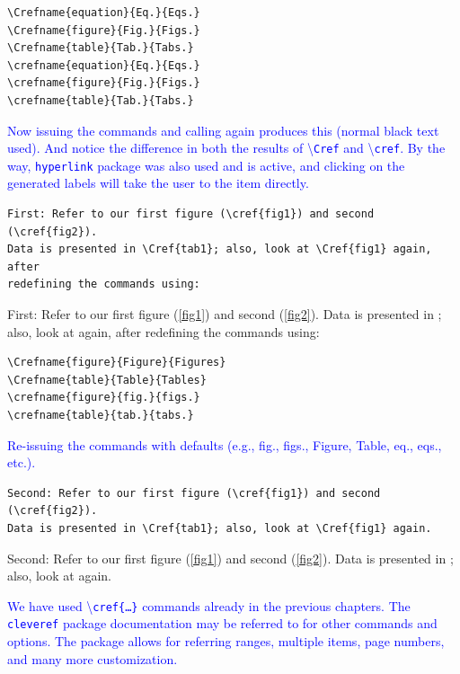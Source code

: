 \documentclass[phd]{ndsu-thesis-2022}
\newcommand\italk[1]{\textcolor{blue}{#1}}  %
\newcommand\cmd[1]{\textbackslash\texttt{#1}}  %
\newcommand\vb[1]{\textcolor{blue}{\texttt{#1}}}%
\begin{document}
\begin{verbatim}
\Crefname{equation}{Eq.}{Eqs.}
\Crefname{figure}{Fig.}{Figs.}
\Crefname{table}{Tab.}{Tabs.}
\crefname{equation}{Eq.}{Eqs.}
\crefname{figure}{Fig.}{Figs.}
\crefname{table}{Tab.}{Tabs.}
\end{verbatim}

\italk{Now issuing the commands and calling again produces this (normal black text used). And notice the difference in both the results of \cmd{Cref} and \cmd{cref}. By the way, \texttt{hyperlink} package was also used and is active, and clicking on the generated labels will take the user to the item directly. }


{\singlespacing
\begin{verbatim}
First: Refer to our first figure (\cref{fig1}) and second (\cref{fig2}). 
Data is presented in \Cref{tab1}; also, look at \Cref{fig1} again, after 
redefining the commands using:
\end{verbatim}
}
First: Refer to our first figure (\cref{fig1}) and second (\cref{fig2}). Data is presented in ; also, look at  again, after redefining the commands using:

\begin{verbatim}
\Crefname{figure}{Figure}{Figures}
\Crefname{table}{Table}{Tables}
\crefname{figure}{fig.}{figs.}
\crefname{table}{tab.}{tabs.}
\end{verbatim}


\italk{Re-issuing the commands with defaults (e.g., fig., figs., Figure, Table, eq., eqs., etc.).}


{\singlespacing
\begin{verbatim}
Second: Refer to our first figure (\cref{fig1}) and second (\cref{fig2}). 
Data is presented in \Cref{tab1}; also, look at \Cref{fig1} again. 
\end{verbatim}
}
Second: Refer to our first figure (\cref{fig1}) and second (\cref{fig2}). Data is presented in ; also, look at  again. 

\italk{We have used \cmd{cref\{\ldots\}} commands already in the previous chapters. The \vb{cleveref} package documentation may be referred to for other commands and options. The package allows for referring ranges, multiple items, page numbers, and many more customization.  
}
\end{document}

